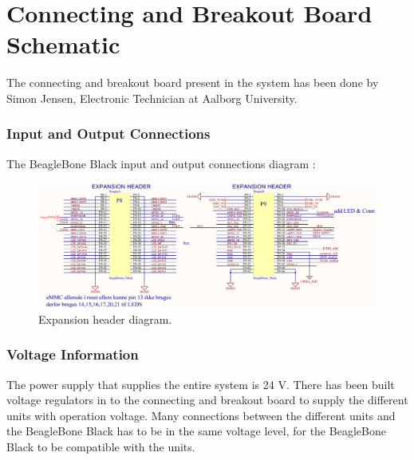 \chapter{Connecting and Breakout Board Schematic}\label{app:ConnectingBreakoutBoard} 

The connecting and breakout board present in the system has been done by Simon Jensen, Electronic Technician at Aalborg University.

\subsection{Input and Output Connections}
The BeagleBone Black input and output connections diagram :\\
\begin{figure}[H]
	\centering
	\includegraphics[scale=0.92]{figures/ExpanionHeader.pdf}
	\caption{Expansion header diagram.}
	\label{labExpanionHeader}
\end{figure}\vspace{-5mm}

\subsection{Voltage Information}
The power supply that supplies the entire system is 24 V. There has been built voltage regulators in to the connecting and breakout board to supply the different units with operation voltage. Many connections between the different units and the BeagleBone Black has to be in the same voltage level, for the BeagleBone Black to be compatible with the units.

